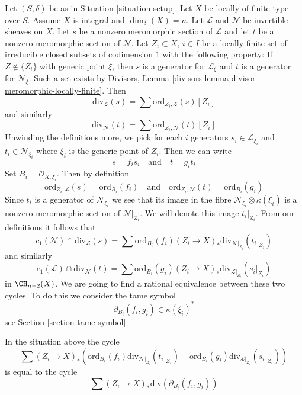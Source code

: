 \noindent
Let $(S, \delta)$ be as in Situation \ref{situation-setup}.
Let $X$ be locally of finite type over $S$. Assume
$X$ is integral and $\dim_\delta(X) = n$.
Let $\mathcal{L}$ and $\mathcal{N}$ be invertible sheaves on $X$.
Let $s$ be a nonzero meromorphic section of $\mathcal{L}$ and
let $t$ be a nonzero meromorphic section of $\mathcal{N}$.
Let $Z_i \subset X$, $i \in I$ be a locally finite set of irreducible
closed subsets of codimension $1$ with the following property:
If $Z \not \in \{Z_i\}$ with generic point $\xi$, then $s$ is a generator
for $\mathcal{L}_\xi$ and $t$ is a generator for $\mathcal{N}_\xi$.
Such a set exists by
Divisors, Lemma \ref{divisors-lemma-divisor-meromorphic-locally-finite}.
Then
$$
\text{div}_\mathcal{L}(s) = \sum \text{ord}_{Z_i, \mathcal{L}}(s) [Z_i]
$$
and similarly
$$
\text{div}_\mathcal{N}(t) = \sum \text{ord}_{Z_i, \mathcal{N}}(t) [Z_i]
$$
Unwinding the definitions more, we pick for each $i$ generators
$s_i \in \mathcal{L}_{\xi_i}$ and $t_i \in \mathcal{N}_{\xi_i}$
where $\xi_i$ is the generic point of $Z_i$. Then we can write
$$
s = f_i s_i
\quad\text{and}\quad
t = g_i t_i
$$
Set $B_i = \mathcal{O}_{X, \xi_i}$. Then by definition
$$
\text{ord}_{Z_i, \mathcal{L}}(s) = \text{ord}_{B_i}(f_i)
\quad\text{and}\quad
\text{ord}_{Z_i, \mathcal{N}}(t) = \text{ord}_{B_i}(g_i)
$$
Since $t_i$ is a generator of $\mathcal{N}_{\xi_i}$ we see that
its image in the fibre $\mathcal{N}_{\xi_i} \otimes \kappa(\xi_i)$
is a nonzero meromorphic section of $\mathcal{N}|_{Z_i}$. We will denote
this image $t_i|_{Z_i}$. From our definitions it follows that
$$
c_1(\mathcal{N}) \cap \text{div}_\mathcal{L}(s) =
\sum \text{ord}_{B_i}(f_i)
(Z_i \to X)_*\text{div}_{\mathcal{N}|_{Z_i}}(t_i|_{Z_i})
$$
and similarly
$$
c_1(\mathcal{L}) \cap \text{div}_\mathcal{N}(t) =
\sum \text{ord}_{B_i}(g_i)
(Z_i \to X)_*\text{div}_{\mathcal{L}|_{Z_i}}(s_i|_{Z_i})
$$
in $\CH_{n - 2}(X)$. We are going to find a rational equivalence between
these two cycles. To do this we consider the tame symbol
$$
\partial_{B_i}(f_i, g_i) \in \kappa(\xi_i)^*
$$
see Section \ref{section-tame-symbol}.

\begin{lemma}
\label{lemma-key-formula}
In the situation above the cycle
$$
\sum
(Z_i \to X)_*\left(
\text{ord}_{B_i}(f_i) \text{div}_{\mathcal{N}|_{Z_i}}(t_i|_{Z_i}) -
\text{ord}_{B_i}(g_i) \text{div}_{\mathcal{L}|_{Z_i}}(s_i|_{Z_i}) \right)
$$
is equal to the cycle
$$
\sum (Z_i \to X)_*\text{div}(\partial_{B_i}(f_i, g_i))
$$
\end{lemma}


